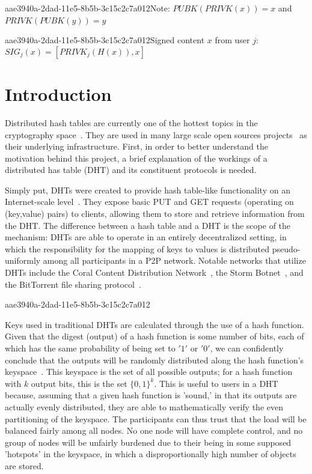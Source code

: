 \documentclass[12pt]{article}
\begin{document}
aae3940a-2dad-11e5-8b5b-3c15c2c7a012Note: $PUBK(PRIVK(x)) = x$ and $PRIVK(PUBK(y)) = y$~

aae3940a-2dad-11e5-8b5b-3c15c2c7a012Signed content $x$ from user $j$: $SIG_j(x) = \left[ PRIVK_j( H(x) ), x \right]$

\section{Introduction}
\par Distributed hash tables are currently one of the hottest topics in the cryptography space~\cite{Stoica:2001dj,Rowstron:2001ea,Ratnasamy:2001wn}. They are used in many large scale open sources projects~\cite{Freitas:2013tb,Xu:2010vs,Perfitt:2010fh} as their underlying infrastructure. First, in order to better understand the motivation behind this project, a brief explanation of the workings of a distributed has table (DHT) and its constituent protocols is needed.

\par Simply put, DHTs were created to provide hash table-like functionality on an Internet-scale level~\cite{Ratnasamy:2001wn}. They expose basic PUT and GET requests (operating on (key,value) pairs) to clients, allowing them to store and retrieve information from the DHT. The difference between a hash table and a DHT is the scope of the mechanism: DHTs are able to operate in an entirely decentralized setting, in which the responsibility for the mapping of keys to values is distributed pseudo-uniformly among all participants in a P2P network. Notable networks that utilize DHTs include the Coral Content Distribution Network~\cite{Freedman:2004vb}, the Storm Botnet~\cite{Holz:2008uk}, and the BitTorrent file sharing protocol~\cite{Cohen:y1_8mBnw}.

aae3940a-2dad-11e5-8b5b-3c15c2c7a012\par Keys used in traditional DHTs are calculated through the use of a hash function. Given that the digest (output) of a hash function is some number of bits, each of which has the same probability of being set to $'1'$ or $'0'$, we can confidently conclude that the outputs will be randomly distributed along the hash function's keyspace~. This keyspace is the set of all possible outputs; for a hash function with $k$ output bits, this is the set $\{0,1\}^k$. This is useful to users in a DHT because, assuming that a given hash function is 'sound,' in that its outputs are actually evenly distributed, they are able to mathematically verify the even partitioning of the keyspace. The participants can thus trust that the load will be balanced fairly among all nodes. No one node will have complete control, and no group of nodes will be unfairly burdened due to their being in some supposed 'hotspots' in the keyspace, in which a disproportionally high number of objects are stored.~
\end{document}
